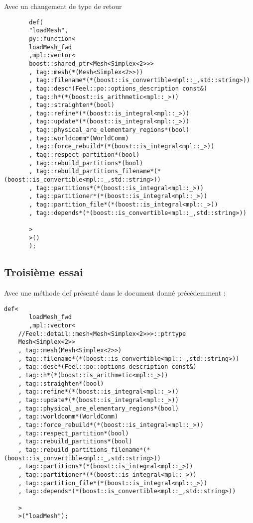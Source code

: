 \documentclass[12pt]{article}
\begin{document}
Avec un changement de type de retour 
\begin{lstlisting}
       def(
       "loadMesh",
       py::function<
       loadMesh_fwd
       ,mpl::vector<
       boost::shared_ptr<Mesh<Simplex<2>>>
       , tag::mesh(*(Mesh<Simplex<2>>))
       , tag::filename*(*(boost::is_convertible<mpl::_,std::string>))
       , tag::desc*(Feel::po::options_description const&)
       , tag::h*(*(boost::is_arithmetic<mpl::_>))
       , tag::straighten*(bool)
       , tag::refine*(*(boost::is_integral<mpl::_>))
       , tag::update*(*(boost::is_integral<mpl::_>))
       , tag::physical_are_elementary_regions*(bool)
       , tag::worldcomm*(WorldComm)
       , tag::force_rebuild*(*(boost::is_integral<mpl::_>))
       , tag::respect_partition*(bool)
       , tag::rebuild_partitions*(bool)
       , tag::rebuild_partitions_filename*(*(boost::is_convertible<mpl::_,std::string>))
       , tag::partitions*(*(boost::is_integral<mpl::_>))
       , tag::partitioner*(*(boost::is_integral<mpl::_>))
       , tag::partition_file*(*(boost::is_integral<mpl::_>))
       , tag::depends*(*(boost::is_convertible<mpl::_,std::string>))

       >
       >()
       );
\end{lstlisting}
 

\subsection{Troisième essai }
Avec une méthode def présenté dans le document donné précédemment :
\begin{lstlisting}
def<
       loadMesh_fwd
       ,mpl::vector<
    //Feel::detail::mesh<Mesh<Simplex<2>>>::ptrtype
    Mesh<Simplex<2>>
    , tag::mesh(Mesh<Simplex<2>>)
    , tag::filename*(*(boost::is_convertible<mpl::_,std::string>))
    , tag::desc*(Feel::po::options_description const&)
    , tag::h*(*(boost::is_arithmetic<mpl::_>))
    , tag::straighten*(bool)
    , tag::refine*(*(boost::is_integral<mpl::_>))
    , tag::update*(*(boost::is_integral<mpl::_>))
    , tag::physical_are_elementary_regions*(bool)
    , tag::worldcomm*(WorldComm)
    , tag::force_rebuild*(*(boost::is_integral<mpl::_>))
    , tag::respect_partition*(bool)
    , tag::rebuild_partitions*(bool)
    , tag::rebuild_partitions_filename*(*(boost::is_convertible<mpl::_,std::string>))
    , tag::partitions*(*(boost::is_integral<mpl::_>))
    , tag::partitioner*(*(boost::is_integral<mpl::_>))
    , tag::partition_file*(*(boost::is_integral<mpl::_>))
    , tag::depends*(*(boost::is_convertible<mpl::_,std::string>))

    >
    >("loadMesh");
\end{lstlisting}
\end{document}
